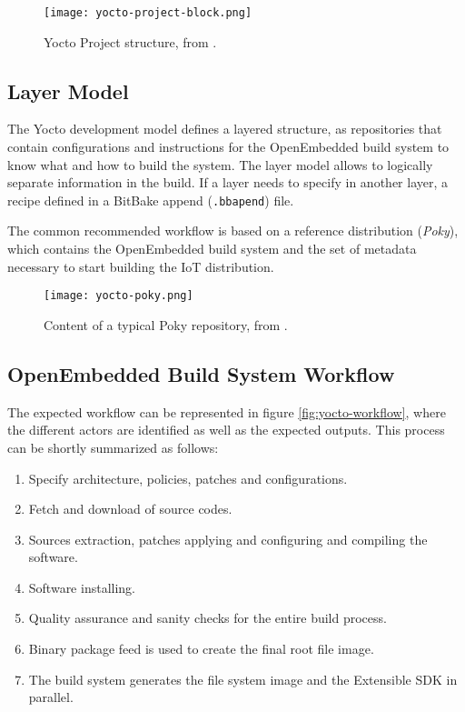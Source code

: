 \begin{figure}[htp]
	\centering
	\texttt{[image: yocto-project-block.png]}
	\caption{Yocto Project structure, from \cite{yocto-manual}.} \label{fig:yocto-project-block}
\end{figure}

\subsection{Layer Model}

The Yocto development model defines a layered structure, as repositories that contain configurations
and instructions for the OpenEmbedded build system to know what and how to build the system. The
layer model allows to logically separate information in the build. If a layer needs to specify in
another layer, a recipe defined in a BitBake append (\texttt{.bbapend}) file.

The common recommended workflow is based on a reference distribution (\textit{Poky}), which contains
the OpenEmbedded build system and the set of metadata necessary to start building the IoT
distribution.

\begin{figure}[htp]
	\centering
	\texttt{[image: yocto-poky.png]}
	\caption{Content of a typical Poky repository, from \cite{yocto-manual}.} \label{fig:yocto-poky}
\end{figure}

\subsection{OpenEmbedded Build System Workflow}

The expected workflow can be represented in figure \ref{fig:yocto-workflow}, where the different
actors are identified as well as the expected outputs. This process can be shortly summarized as
follows:

\begin{enumerate}
	\item Specify architecture, policies, patches and configurations.
	\item Fetch and download of source codes.
	\item Sources extraction, patches applying and configuring and compiling the software.
	\item Software installing.
	\item Quality assurance and sanity checks for the entire build process.
	\item Binary package feed is used to create the final root file image.
	\item The build system generates the file system image and the Extensible SDK in parallel.
\end{enumerate}

